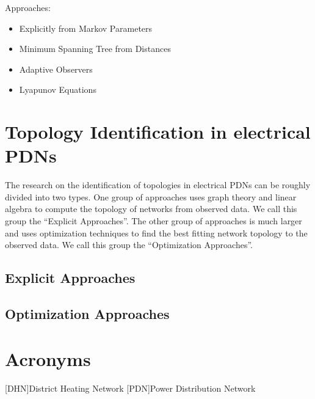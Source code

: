 \documentclass{scrartcl}
\begin{document}
    Approaches:
    \begin{itemize}
      \item Explicitly from Markov Parameters
      \item Minimum Spanning Tree from Distances
      \item Adaptive Observers
      \item Lyapunov Equations
    \end{itemize}

    \section{Topology Identification in electrical \acp{PDN}}
    \label{sec:topology-identification-electrical}

    The research on the identification of topologies in electrical \acp{PDN} can be roughly divided into two types.
    One group of approaches uses graph theory and linear algebra to compute the topology of networks from observed data.
    We call this group the ``Explicit Approaches''.
    The other group of approaches is much larger and uses optimization techniques to find the best fitting network topology to the observed data.
    We call this group the ``Optimization Approaches''.

    \subsection{Explicit Approaches}

    \subsection{Optimization Approaches}

    \printbibliography

    \section{Acronyms}

    \begin{acronym}
        [DHN]{District Heating Network}
        [PDN]{Power Distribution Network}
    \end{acronym}
\end{document}
